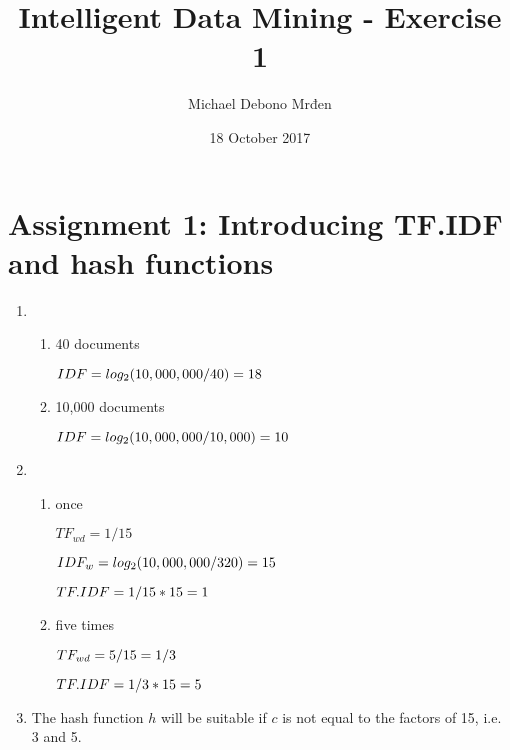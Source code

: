 \documentclass{article}
\title{Intelligent Data Mining - Exercise 1}
\author{Michael Debono Mrđen}
\date{18 October 2017}
\begin{document}
\maketitle

\section{Assignment 1: Introducing TF.IDF and hash functions}
\renewcommand{\labelenumi}{\alph{enumi}.}
\renewcommand{\labelenumii}{(\alph{enumii})}
\begin{enumerate}
\item
\begin{enumerate}
\item{40 documents

$IDF \\ = log_2(10,000,000/40) \\ = 18$}

\item{10,000 documents

$IDF \\ = log_2(10,000,000/10,000) \\ = 10$}
\end{enumerate}
\item
\begin{enumerate}
\item{once

$TF_{wd} = 1/15$

$IDF_w = log_2(10,000,000/320) \\ = 15$

$TF.IDF = 1/15 * 15 \\ = 1$}

\item{five times

$TF_{wd} = 5/15 \\ = 1/3$

$TF.IDF = 1/3 * 15 \\ = 5$}
\end{enumerate}
\item{The hash function $h$ will be suitable if $c$ is not equal to the factors of 15, i.e. 3 and 5.}
\end{enumerate}
\end{document}
